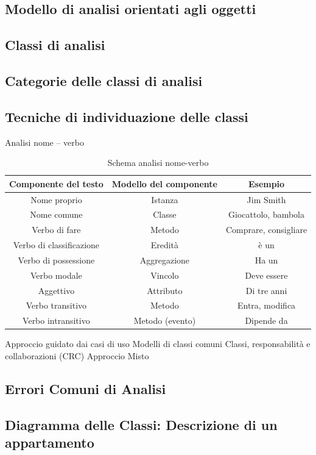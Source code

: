 \documentclass{article}
\begin{document}
	\subsection{Modello di analisi orientati agli oggetti}
	\subsection{Classi di analisi}
	\subsection{Categorie delle classi di analisi}
	\subsection{Tecniche di individuazione delle classi}
	Analisi nome – verbo
	\begin{table}[h!]
		\centering
		\begin{tabular}{ |c|c|c| } 
			\hline
			\textbf{Componente del testo} & \textbf{Modello del componente} & \textbf{Esempio}\\
			\hline
			Nome proprio & Istanza & Jim Smith\\
			\hline
			Nome comune & Classe &Giocattolo, bambola\\
			\hline
			Verbo di fare & Metodo & Comprare, consigliare\\
			\hline
			Verbo di classificazione & Eredità & è un\\
			\hline
			Verbo di possessione & Aggregazione & Ha un\\
			\hline
			Verbo modale & Vincolo & Deve essere\\
			\hline
			Aggettivo & Attributo & Di tre anni\\
			\hline
			Verbo transitivo & Metodo & Entra, modifica\\
			\hline
			Verbo intransitivo & Metodo (evento) & Dipende da\\
			\hline
		\end{tabular}
		\caption{Schema analisi nome-verbo}
	\end{table}
	Approccio guidato dai casi di uso
	Modelli di classi comuni
	Classi, responsabilità e collaborazioni (CRC)
	Approccio Misto
	\subsection{Errori Comuni di Analisi}
	\subsection{Diagramma delle Classi: Descrizione di un appartamento}
\end{document}
